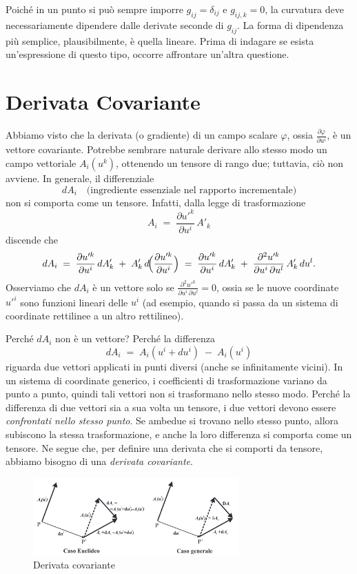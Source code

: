 Poiché in un punto si può sempre imporre $g_{ij} = \delta_{ij}$ e $g_{ij,k} = 0$, la curvatura deve necessariamente dipendere dalle derivate seconde di $g_{ij}$. La forma di dipendenza più semplice, plausibilmente, è quella lineare. Prima di indagare se esista un'espressione di questo tipo, occorre affrontare un'altra questione.

\newpage

\section{Derivata Covariante}

Abbiamo visto che la derivata (o gradiente) di un campo scalare $\varphi$, ossia $\frac{\partial \varphi}{\partial u^i}$, è un vettore covariante. Potrebbe sembrare naturale derivare allo stesso modo un campo vettoriale $A_i(u^k)$, ottenendo un tensore di rango due; tuttavia, ciò non avviene. In generale, il differenziale
$$
dA_i \quad\text{(ingrediente essenziale nel rapporto incrementale)}
$$
non si comporta come un tensore. Infatti, dalla legge di trasformazione
$$
A_i \;=\; \frac{\partial u'^k}{\partial u^i}\,A'_k
$$
discende che
$$
dA_i \;=\; \frac{\partial u'^k}{\partial u^i}\,dA'_k
\;+\;
A'_k\,d\!\Bigl(\frac{\partial u'^k}{\partial u^i}\Bigr)
\;=\;
\frac{\partial u'^k}{\partial u^i}\,dA'_k
\;+\;
\frac{\partial^2 u'^k}{\partial u^i\,\partial u^l}\,A'_k\,du^l.
$$
Osserviamo che $dA_i$ è un vettore solo se $\frac{\partial^2 u'^k}{\partial u^i\,\partial u^l} = 0$, ossia se le nuove coordinate $u'^i$ sono funzioni lineari delle $u^i$ (ad esempio, quando si passa da un sistema di coordinate rettilinee a un altro rettilineo).

Perché $dA_i$ non è un vettore? Perché la differenza
$$
dA_i \;=\; A_i(u^i + du^i) \;-\; A_i(u^i)
$$
riguarda due vettori applicati in punti diversi (anche se infinitamente vicini). In un sistema di coordinate generico, i coefficienti di trasformazione variano da punto a punto, quindi tali vettori non si trasformano nello stesso modo. Perché la differenza di due vettori sia a sua volta un tensore, i due vettori devono essere \emph{confrontati nello stesso punto}. Se ambedue si trovano nello stesso punto, allora subiscono la stessa trasformazione, e anche la loro differenza si comporta come un tensore. Ne segue che, per definire una derivata che si comporti da tensore, abbiamo bisogno di una \emph{derivata covariante}.

\begin{figure}[H]
    \centering
    \includegraphics[width=0.7\textwidth]{assets/cov_der.png}
    \caption{Derivata covariante}
    \label{fig:der_cov}
\end{figure}

